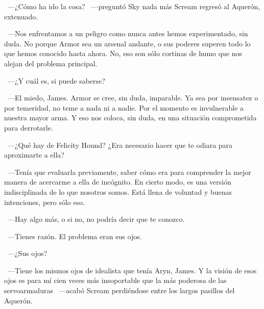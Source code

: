 \bigskip\noindent
~---¿Cómo ha ido la cosa? ~---preguntó Sky nada más Scream regresó al Aquerón, extenuado.

~---Nos enfrentamos a un peligro como nunca antes hemos experimentado, sin duda. No porque Armor sea un arsenal andante, o sus poderes superen todo lo que hemos conocido hasta ahora. No, eso son sólo cortinas de humo que nos alejan del problema principal.

~---¿Y cuál es, si puede saberse?

~---El miedo, James. Armor se cree, sin duda, imparable. Ya sea por insensatez o por temeridad, no teme a nada ni a nadie. Por el momento es invulnerable a nuestra mayor arma. Y eso nos coloca, sin duda, en una situación comprometida para derrotarle.

~---¿Qué hay de Felicity Hound? ¿Era necesario hacer que te odiara para aproximarte a ella?

~---Tenía que evaluarla previamente, saber cómo era para comprender la mejor manera de acercarme a ella de incógnito. En cierto modo, es una versión indisciplinada de lo que nosotros somos. Está llena de voluntad y buenas intenciones, pero sólo eso.

~---Hay algo más, o si no, no podría decir que te conozco.

~---Tienes razón. El problema eran sus ojos.

~---¿Sus ojos?

~---Tiene los mismos ojos de idealista que tenía Aryn, James. Y la visión de esos ojos es para mí cien veces más insoportable que la más poderosa de las servoarmaduras ~---acabó Scream perdiéndose entre los largos pasillos del Aquerón.

\endinput
